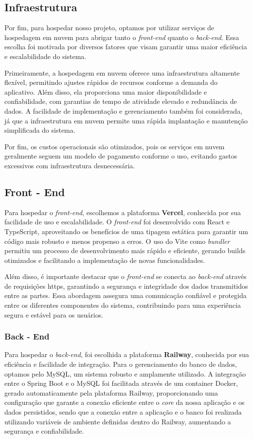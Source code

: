 \subsection{Infraestrutura}
Por fim, para hospedar nosso projeto, optamos por utilizar serviços de hospedagem em nuvem para abrigar tanto o \textit{front-end} quanto o \textit{back-end}. Essa escolha foi motivada por diversos fatores que visam garantir uma maior eficiência e escalabilidade do sistema.

Primeiramente, a hospedagem em nuvem oferece uma infraestrutura altamente flexível, permitindo ajustes rápidos de recursos conforme a demanda do aplicativo. Além disso, ela proporciona uma maior disponibilidade e confiabilidade, com garantias de tempo de atividade elevado e redundância de dados. A facilidade de implementação e gerenciamento também foi considerada, já que a infraestrutura em nuvem permite uma rápida implantação e manutenção simplificada do sistema.

Por fim, os custos operacionais são otimizados, pois os serviços em nuvem geralmente seguem um modelo de pagamento conforme o uso, evitando gastos excessivos com infraestrutura desnecessária.

\subsection{Front - End}
Para hospedar o \textit{front-end}, escolhemos a plataforma \textbf{Vercel}, conhecida por sua facilidade de uso e escalabilidade. O \textit{front-end} foi desenvolvido com React e TypeScript, aproveitando os benefícios de uma tipagem estática para garantir um código mais robusto e menos propenso a erros. O uso do Vite como \textit{bundler} permitiu um processo de desenvolvimento mais rápido e eficiente, gerando builds otimizados e facilitando a implementação de novas funcionalidades. 

Além disso, é importante destacar que o \textit{front-end} se conecta ao \textit{back-end} através de requisições \ac{https}, garantindo a segurança e integridade dos dados transmitidos entre as partes. Essa abordagem assegura uma comunicação confiável e protegida entre os diferentes componentes do sistema, contribuindo para uma experiência segura e estável para os usuários.

\subsubsection{Back - End}
Para hospedar o \textit{back-end}, foi escolhida a plataforma \textbf{Railway}, conhecida por sua eficiência e facilidade de integração. Para o gerenciamento do banco de dados, optamos pelo MySQL, um sistema robusto e amplamente utilizado. A integração entre o Spring Boot e o MySQL foi facilitada através de um container Docker, gerado automaticamente pela plataforma Railway, proporcionando uma configuração que garante a conexão eficiente entre o \textit{core} da nossa aplicação e os dados persistidos, sendo que a conexão entre a aplicação e o banco foi realizada utilizando variáveis de ambiente definidas dentro do Railway, aumentando a segurança e confiabilidade. 



